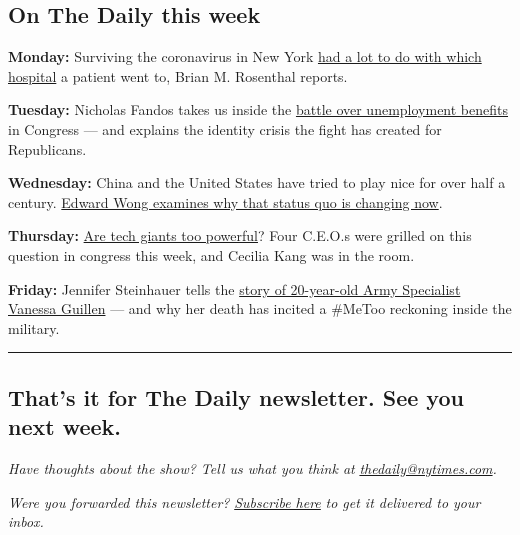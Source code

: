 \hypertarget{on-the-daily-this-week}{%
\subsection{On The Daily this week}\label{on-the-daily-this-week}}

\textbf{Monday:} Surviving the coronavirus in New York
\href{https://www.nytimes.com/2020/07/27/podcasts/the-daily/new-york-hospitals-covid.html}{had
a lot to do with which hospital} a patient went to, Brian M. Rosenthal
reports.

\textbf{Tuesday:} Nicholas Fandos takes us inside the
\href{https://www.nytimes.com/2020/07/28/podcasts/the-daily/unemployment-benefits-coronavirus.html}{battle
over unemployment benefits} in Congress --- and explains the identity
crisis the fight has created for Republicans.

\textbf{Wednesday:} China and the United States have tried to play nice
for over half a century.
\href{https://www.nytimes.com/2020/07/29/podcasts/the-daily/china-trump-foreign-policy.html}{Edward
Wong examines why that status quo is changing now}.

\textbf{Thursday:}
\href{https://www.nytimes.com/2020/07/30/podcasts/the-daily/congress-facebook-amazon-google-apple.html}{Are
tech giants too powerful}? Four C.E.O.s were grilled on this question in
congress this week, and Cecilia Kang was in the room.

\textbf{Friday:} Jennifer Steinhauer tells the
\href{https://www.nytimes.com/2020/07/31/podcasts/the-daily/vanessa-guillen-military-metoo.html}{story
of 20-year-old Army Specialist Vanessa Guillen} --- and why her death
has incited a \#MeToo reckoning inside the military.

\begin{center}\rule{0.5\linewidth}{\linethickness}\end{center}

\hypertarget{thats-it-for-the-daily-newsletter-see-you-next-week}{%
\subsection{That's it for The Daily newsletter. See you next
week.}\label{thats-it-for-the-daily-newsletter-see-you-next-week}}

\emph{Have thoughts about the show? Tell us what you think at}
\href{mailto:thedaily@nytimes.com?subject=The\%20Daily\%20newsletter}{\emph{thedaily@nytimes.com}}\emph{.}

\emph{Were you forwarded this newsletter?}
\href{https://www.nytimes.com/newsletters/the-daily?te=1\&nl=the-daily\&emc=edit_dy_20190627}{\emph{Subscribe
here}} \emph{to get it delivered to your inbox.}

